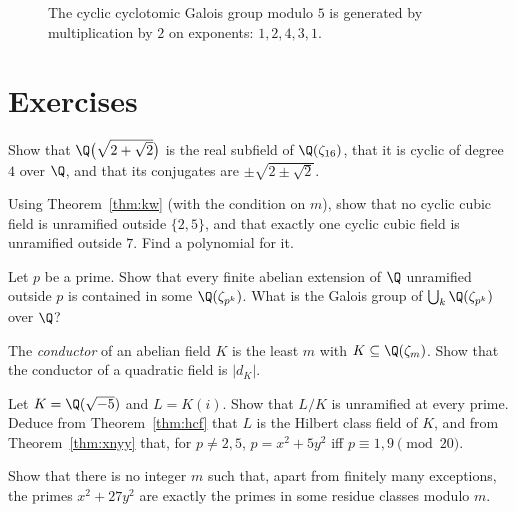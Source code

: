 \begin{figure}[ht]
\centering
{}
\caption{The cyclic cyclotomic Galois group modulo $5$ is generated by multiplication by $2$ on exponents: $1,2,4,3,1$.}
\label{fig:v13-extra-13-b}
\end{figure}

\section{Exercises}

\begin{exercise}[$\star$]\label{ex:sqrt2plus}
Show that $\Q\bigl(\sqrt{2+\sqrt2}\bigr)$ is the real subfield of $\Q(\zeta_{16})$, that it is cyclic of degree $4$ over $\Q$, and that its conjugates are
$\pm\sqrt{2\pm\sqrt2}$.
\end{exercise}

\begin{exercise}[$\star$]\label{ex:nocubic}
Using Theorem~\ref{thm:kw} (with the condition on $m$), show that no cyclic cubic field is unramified outside $\{2,5\}$, and that exactly one cyclic cubic field
is unramified outside $7$. Find a polynomial for it.
\end{exercise}

\begin{exercise}[$\star$]\label{ex:maxabp}
Let $p$ be a prime. Show that every finite abelian extension of $\Q$ unramified outside $p$ is contained in some $\Q(\zeta_{p^k})$. What is the Galois
group of $\bigcup_k\Q(\zeta_{p^k})$ over $\Q$?
\end{exercise}

\begin{exercise}[$\star\star$]\label{ex:quadcond}
The \emph{conductor} of an abelian field $K$ is the least $m$ with $K\subseteq\Q(\zeta_m)$. Show that the conductor of a quadratic field is $|d_K|$.
\end{exercise}

\begin{exercise}[$\star\star$]\label{ex:hcf5}
Let $K=\Q(\sqrt{-5})$ and $L=K(i)$. Show that $L/K$ is unramified at every prime. Deduce from Theorem~\ref{thm:hcf} that $L$ is the Hilbert class field
of $K$, and from Theorem~\ref{thm:xnyy} that, for $p\ne2,5$, $p=x^2+5y^2$ iff $p\equiv1,9\pmod{20}$.
\end{exercise}

\begin{exercise}[$\star\star$]\label{ex:nocongruence}
Show that there is no integer $m$ such that, apart from finitely many exceptions, the primes $x^2+27y^2$ are exactly the primes in some residue classes
modulo $m$.
\end{exercise}


